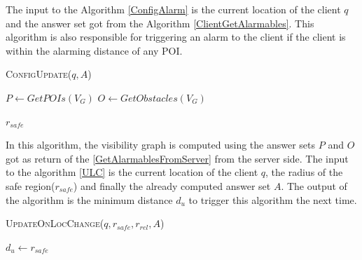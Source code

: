 The input to the Algorithm \ref{ConfigAlarm} is the current location of the client $q$ and the answer set got from the Algorithm \ref{ClientGetAlarmables}. This algorithm is also responsible for triggering an alarm to the client if the client is within the alarming distance of any POI.
\begin{algorithm}
\caption{\textsc{ConfigUpdate}($q, A$)}
\label{ConfigAlarm}

    
    $P \gets GetPOIs(V_G)$\;
    $O \gets GetObstacles(V_G)$\;
    
    \Return $r_{safe}$

\end{algorithm}

In this algorithm, the visibility graph is computed using the answer sets $P$ and $O$ got as return of the \ref{GetAlarmablesFromServer} from the server side.
The input to the algorithm \ref{ULC} is the current location of the client $q$, the radius of the safe region($r_{safe}$) and finally the already computed answer set $A$. The output of the algorithm is the minimum distance $d_u$ to trigger this algorithm the next time.

\begin{algorithm}
\caption{\textsc{UpdateOnLocChange}($q, r_{safe}, r_{rel}, A$)}
\label{ULC}

    
    
    
    \Return $d_u \gets r_{safe}$

\end{algorithm}

